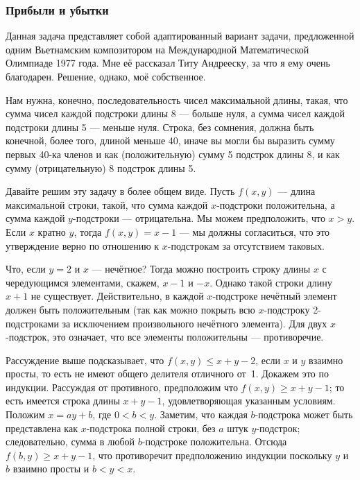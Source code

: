 \subsubsection*{Прибыли и убытки}%


Данная задача представляет собой адаптированный вариант задачи, предложенной одним Вьетнамским композитором на Международной Математической Олимпиаде 1977 года. 
Мне её рассказал Титу Андрееску, %
за что я ему очень благодарен. 
Решение, однако, моё собственное.


Нам нужна, конечно, последовательность чисел максимальной длины, такая, что сумма чисел каждой подстроки длины 8 --- больше нуля, а  сумма чисел каждой подстроки длины 5 --- меньше нуля.  Строка, без сомнения, должна быть конечной, более того,  длиной меньше 40, иначе  вы могли бы выразить сумму первых 40-ка членов и как  (положительную) сумму 5 подстрок длины 8, и как сумму (отрицательную)  8 подстрок длины 5. 


Давайте решим эту задачу в более общем виде. Пусть  $f(x,y)$ --- длина максимальной строки, такой, что сумма каждой $x$-подстроки положительна, а сумма каждой $y$-подстроки --- отрицательна. 
Мы можем предположить, что $x>y$. 
Если $x$ кратно $y$, тогда $f(x,y)=x-1$ --- мы должны согласиться, что это утверждение верно по отношению к $x$-подстрокам за отсутствием таковых.


Что, если  $y=2$  и  $x$ --- нечётное?
Тогда можно построить строку длины $x$ с чередующимся элементами, скажем, $x-1$ и $-x$. 
Однако такой строки длину $x+1$ не существует.
Действительно, в каждой $x$-подстроке нечётный элемент должен быть положительным 
(так как можно покрыть всю $x$-подстроку 2-подстроками за исключением произвольного нечётного элемента).  
Для двух $x$-подстрок, это означает, что все элементы положительны  ---
противоречие. 


Рассуждение выше подсказывает, что $f(x,y)\le x+y-2$,  если $x$ и $y$ взаимно просты, 
то есть не имеют общего делителя отличного от~1. 
Докажем это по индукции. 
Рассуждая от противного, предположим что $f(x,y)\ge x+y-1$;
то есть имеется строка длины $x+y-1$, удовлетворяющая указанным условиям.  
Положим $x=ay+b$, где $0<b<y$. 
Заметим, что каждая $b$-подстрока %
может быть представлена  как $x$-подстрока полной строки, 
без $a$ штук $y$-подстрок; 
следовательно, сумма в любой $b$-подстроке положительна. 
Отсюда
$f(b,y)\ge x+y-1$,
что противоречит предположению индукции поскольку $y$ и $b$ взаимно просты и $b<y<x$.

